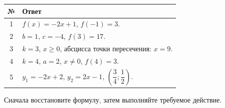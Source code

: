\documentclass[a4paper,12pt]{article}
\begin{document}
\begin{center}
\begin{tabularx}{\linewidth}{@{}c X@{}}
\toprule
\textbf{№} & \textbf{Ответ} \\
\midrule

1 &
$f(x)=-2x+1$, \quad $f(-1)=3$.
\\

2 &
$b=1$, \quad $c=-4$, \quad $f(3)=17$.
\\

3 &
$k=3$, \quad $x\ge0$, \quad абсцисса точки пересечения: $x=9$.
\\

4 &
$k=4$, \quad $a=2$, \quad $x\ne0$, \quad $f(4)=3$.
\\

5 &
$y_1=-2x+2$, \quad
$y_2=2x-1$, \quad
$\left(\dfrac34;\dfrac12\right)$.
\\

\bottomrule
\end{tabularx}
\end{center}

\vfill

\begin{center}
{\small\color{linegray}
Сначала восстановите формулу, затем выполняйте требуемое действие.}
\end{center}
\end{document}

